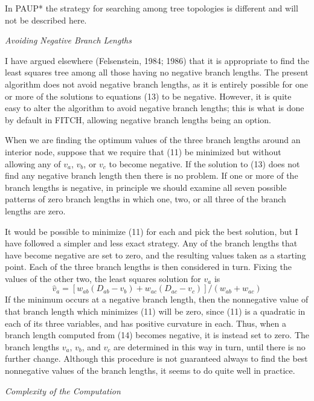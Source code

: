 \documentclass[12pt]{article}
\begin{document}
In PAUP* the strategy for searching among tree topologies is different and
will not be described here.
\bigskip

\centerline{\it Avoiding Negative Branch Lengths}
\bigskip

I have argued elsewhere (Felsenstein, 1984; 1986) that it is 
appropriate to
find the least squares tree among all those having no negative branch
lengths.  The present algorithm does not avoid negative branch lengths, as
it is entirely possible for one or more of the solutions to equations (13)
to be negative.  However, it is quite easy to alter the algorithm to avoid
negative branch lengths; this is what is done by default in FITCH,
allowing negative branch lengths being an option.

When we are finding the optimum values of the three branch lengths around an
interior node, suppose that we require that (11) be minimized but without
allowing any of $v_a$, $v_b$, or $v_c$ to become negative.
If the solution to (13) does not
find any negative branch length then there is no problem.  If one or more of the
branch lengths is negative, in principle we should examine all seven
possible patterns of zero branch lengths in which one, two, or all three of
the branch lengths are zero.

It would be possible to minimize (11) for each
and pick the best solution, but I have followed a simpler and less exact
strategy.  Any of the branch lengths that have become negative are set to
zero, and the resulting values taken as a starting point.  Each of the three
branch lengths is then considered in turn.  Fixing the values of the other
two, the least squares solution for $v_a$ is 
\begin{equation} %
      \hat{v}_a   =   \left[ w_{ab} (D_{ab} - v_b)  +  w_{ac} (D_{ac} - v_c) \right] \Big/ (w_{ab}  +  w_{ac})
\end{equation}
If the minimum occurs at a
negative branch length, then the nonnegative value of that branch length which 
minimizes (11) will be zero, since (11) is a quadratic in each of its three
variables, and has positive curvature in each.  Thus, when a branch length
computed from (14) becomes
negative, it is instead set to zero.  The branch lengths $v_a$, $v_b$, and $v_c$ are
determined in this way in turn, until there is no further change.  Although
this procedure is not guaranteed always to find the best nonnegative values
of the branch lengths, it seems to do quite well in practice.
\bigskip

\centerline{\it Complexity of the Computation}
\bigskip
\end{document}
